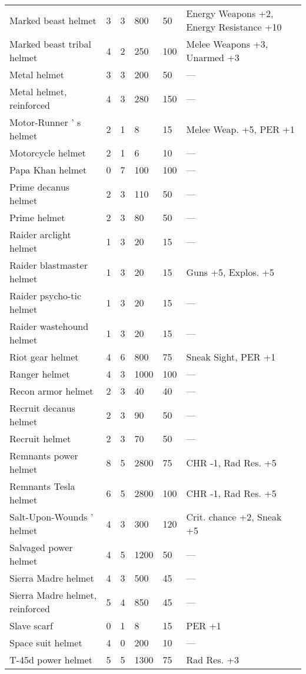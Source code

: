 \documentclass{report}
\begin{document}
\begin{table}[H]
\begin{table}[H]
\begin{table}[H]
\begin{table}[H]
\begin{table}[H]
\begin{table}[H]
\begin{table}[H]
\begin{table}[H]
\begin{table}[H]
\begin{table}[H]
\begin{table}[H]
\begin{table}[H]
\begin{table}[H]
\begin{table}[H]
\begin{table}[H]
\begin{table}[H]
\begin{table}[H]
\begin{table}[H]
\begin{table}[H]
\begin{table}[H]
\begin{table}[H]
\begin{table}[H]
\begin{table}[H]
\begin{tabular}{p{30mm}p{30mm}p{30mm}p{30mm}p{30mm}p{30mm}}
Marked beast helmet  & 3 & 3 & 800 & 50 & Energy Weapons +2, Energy Resistance +10  \\
Marked beast tribal helmet  & 4 & 2 & 250 & 100 & Melee Weapons +3, Unarmed +3  \\
Metal helmet  & 3 & 3 & 200 & 50 & —  \\
Metal helmet, reinforced  & 4 & 3 & 280 & 150 & —  \\
Motor-Runner ' s helmet  & 2 & 1 & 8 & 15 & Melee Weap. +5, PER +1  \\
Motorcycle helmet  & 2 & 1 & 6 & 10 & —  \\
Papa Khan helmet  & 0 & 7 & 100 & 100 & —  \\
Prime decanus helmet  & 2 & 3 & 110 & 50 & —  \\
Prime helmet  & 2 & 3 & 80 & 50 & —  \\
Raider arclight helmet  & 1 & 3 & 20 & 15 & —  \\
Raider blastmaster helmet  & 1 & 3 & 20 & 15 & Guns +5, Explos. +5  \\
Raider psycho-tic helmet  & 1 & 3 & 20 & 15 & —  \\
Raider wastehound helmet  & 1 & 3 & 20 & 15 & —  \\
Riot gear helmet  & 4 & 6 & 800 & 75 & Sneak Sight, PER +1  \\
Ranger helmet  & 4 & 3 & 1000 & 100 & —  \\
Recon armor helmet  & 2 & 3 & 40 & 40 & —  \\
Recruit decanus helmet  & 2 & 3 & 90 & 50 & —  \\
Recruit helmet  & 2 & 3 & 70 & 50 & —  \\
Remnants power helmet  & 8 & 5 & 2800 & 75 & CHR -1, Rad Res. +5  \\
Remnants Tesla helmet  & 6 & 5 & 2800 & 100 & CHR -1, Rad Res. +5  \\
Salt-Upon-Wounds '  helmet  & 4 & 3 & 300 & 120 & Crit. chance +2, Sneak +5  \\
Salvaged power helmet  & 4 & 5 & 1200 & 50 & —  \\
Sierra Madre helmet  & 4 & 3 & 500 & 45 & —  \\
Sierra Madre helmet, reinforced  & 5 & 4 & 850 & 45 & —  \\
Slave scarf  & 0 & 1 & 8 & 15 & PER +1  \\
Space suit helmet  & 4 & 0 & 200 & 10 & —  \\
T-45d power helmet  & 5 & 5 & 1300 & 75 & Rad Res. +3  \\

\end{tabular}
\end{table}
\end{table}
\end{table}
\end{table}
\end{table}
\end{table}
\end{table}
\end{table}
\end{table}
\end{table}
\end{table}
\end{table}
\end{table}
\end{table}
\end{table}
\end{table}
\end{table}
\end{table}
\end{table}
\end{table}
\end{table}
\end{table}
\end{table}
\end{document}
